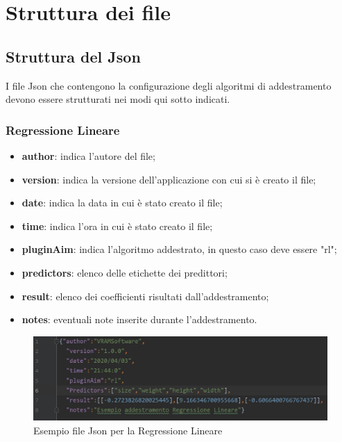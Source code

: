 \section{Struttura dei file}
	\subsection{Struttura del Json}
	I file Json che contengono la configurazione degli algoritmi di addestramento devono essere strutturati nei modi qui sotto indicati.
		\subsubsection{Regressione Lineare}
		\begin{itemize}
			\item \textbf{author}: indica l'autore del file;
			\item \textbf{version}: indica la versione dell'applicazione con cui si è creato il file;
			\item \textbf{date}: indica la data in cui è stato creato il file;
			\item \textbf{time}: indica l'ora in cui è stato creato il file;
			\item \textbf{pluginAim}: indica l'algoritmo addestrato, in questo caso deve essere "rl";
			\item \textbf{predictors}: elenco delle etichette dei predittori;
			\item \textbf{result}: elenco dei coefficienti risultati dall'addestramento;
			\item \textbf{notes}: eventuali note inserite durante l'addestramento.
		\end{itemize}
		\mbox{}
		\begin{figure} [H]
			\begin{center}
				\includegraphics[width=\linewidth]{./img/jsonRl.jpg}
			\end{center}
			\caption{Esempio file Json per la Regressione Lineare}
		\end{figure}
		\mbox{}
